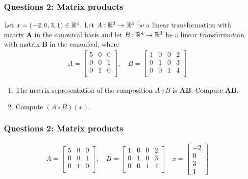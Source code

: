 \documentclass{beamer}
\begin{document}
\begin{frame}[t]
	\frametitle{Questions 2: Matrix products}
	Let $x = (-2,0,3,1) \in \mathbb{R}^4$. Let $A : \mathbb{R}^{3} \to \mathbb{R}^3$ be a linear transformation with matrix $\mathbf{A}$ in the canonical basis and let $B : \mathbb{R}^{4} \to \mathbb{R}^3$ be a linear transformation with matrix $\mathbf{B}$ in the canonical, where 
	\begin{align*}
	A = \begin{bmatrix}
			5 & 0 & 0  \\
			0 & 0 & 1  \\
			0 & 1 & 0   \\
			\end{bmatrix},
	\quad B = \begin{bmatrix}
			1 & 0 & 0 & 2 \\
			0 & 1 & 0 & 3 \\
			0 & 0 & 1 & 4 \\
			\end{bmatrix}
	\end{align*}
	\begin{enumerate}
	\item The matrix representation of the composition $A \circ B$ is $\mathbf{A} \mathbf{B}$. Compute $\mathbf{A} \mathbf{B}$.
	\item Compute $(A \circ B)(x)$. 
	\end{enumerate}
\end{frame}

\begin{frame}[t]
	\frametitle{Questions 2: Matrix products} 
	\grid
	\begin{align*}
	A = \begin{bmatrix}
			5 & 0 & 0  \\
			0 & 0 & 1  \\
			0 & 1 & 0   \\
			\end{bmatrix},
	\quad B = \begin{bmatrix}
			1 & 0 & 0 & 2 \\
			0 & 1 & 0 & 3 \\
			0 & 0 & 1 & 4 \\
			\end{bmatrix} 
	\quad x = \begin{bmatrix}
	-2 \\ 0 \\ 3 \\ 1
	\end{bmatrix}
	\end{align*}
	\pause
	\pause
\end{frame}
\end{document}
